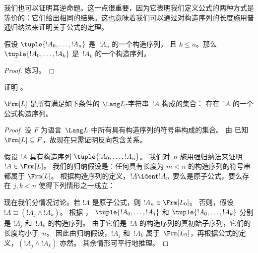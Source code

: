 \documentclass[../../../include/open-logic-section]{subfiles}
\begin{document}
我们也可以证明其逆命题。这一点很重要，因为它表明我们定义公式的两种方式是等价的：它们给出相同的结果。这也意味着我们可以通过对构造序列的长度施用普通归纳法来证明关于公式的定理。

\begin{lem}
假设 $\tuple{!A_0,\dotsc,!A_n}$ 是~$!A_n$ 的一个构造序列，
且 $k \leq n$。那么 $\tuple{!A_0,\dotsc,!A_k}$
是~$!A_k$ 的一个构造序列。
\end{lem}

\begin{proof}
练习。
\end{proof}

\begin{prob}
证明 。
\end{prob}

\begin{thm}
$\Frm[L]$ 是所有满足如下条件的 $\Lang L$-字符串~$!A$ 构成的集合：
存在~$!A$ 的一个公式构造序列。
\end{thm}

\begin{proof}
设 $F$ 为语言~$\Lang L$ 中所有具有构造序列的符号串构成的集合。
由  已知 $\Frm[L] \subseteq F$，故现在只需证明反向包含关系。

假设 $!A$ 具有构造序列 $\tuple{!A_0,\dotsc,!A_n}$。
我们对~$n$ 施用强归纳法来证明 $!A \in \Frm[L]$。
我们的归纳假设是：任何具有长度为 $m < n$ 的构造序列的符号串都属于 $\Frm[L]$。
根据构造序列的定义，$!A \ident !A_n$ 要么是原子公式，要么存在 $j,k < n$ 使得下列情形之一成立：
\begin{enumerate}
\end{enumerate}
现在我们分情况讨论。若 $!A$ 是原子公式，则 $!A_n \in \Frm[L_0]$。
否则，假设 $!A \equiv (!A_j \land !A_k)$。
根据 ，
$\tuple{!A_0,\dotsc,!A_j}$ 和 $\tuple{!A_0,\dotsc,!A_k}$ 分别是 $!A_j$ 和~$!A_k$ 的构造序列。
由于它们是~$!A$ 的构造序列的真初始子序列，它们的长度均小于~$n$。
因此由归纳假设，$!A_j$ 和~$!A_k$ 属于~$\Frm[L_0]$，再根据公式的定义，$(!A_j \land !A_k)$ 亦然。
其余情形可平行地推理。
\end{proof}
\end{document}
